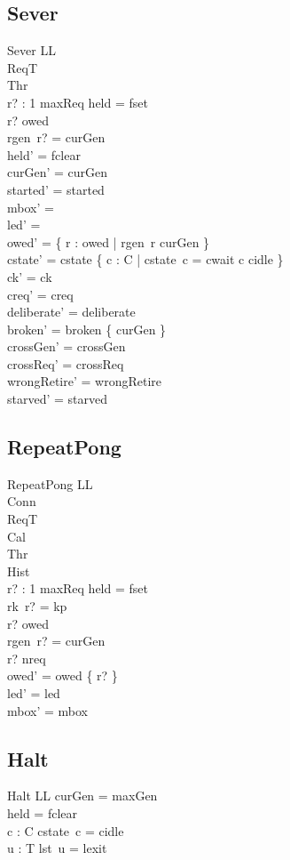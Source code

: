 \documentclass[a4paper,10pt,fleqn]{article}
\begin{document}
\subsection{Sever}

\begin{schema}{Sever}
  \Delta LL \\
  \Xi ReqT \\
  \Xi Thr \\
  r? : 1 \upto maxReq
\where
  held = fset \\
  r? \in owed \\
  rgen~r? = curGen \\
  held' = fclear \\
  curGen' = curGen \\
  started' = started \\
  mbox' = \emptyset \\
  led' = \emptyset \\
  owed' = \{ r : owed | rgen~r \neq curGen \} \\
  cstate' = cstate \oplus \{ c : C | cstate~c = cwait \spot c \mapsto cidle \} \\
  ck' = ck \\
  creq' = creq \\
  deliberate' = deliberate \\
  broken' = broken \cup \{ curGen \} \\
  crossGen' = crossGen \\
  crossReq' = crossReq \\
  wrongRetire' = wrongRetire \\
  starved' = starved
\end{schema}

\subsection{RepeatPong}

\begin{schema}{RepeatPong}
  \Delta LL \\
  \Xi Conn \\
  \Xi ReqT \\
  \Xi Cal \\
  \Xi Thr \\
  \Xi Hist \\
  r? : 1 \upto maxReq
\where
  held = fset \\
  rk~r? = kp \\
  r? \notin owed \\
  rgen~r? = curGen \\
  r? \leq nreq \\
  owed' = owed \cup \{ r? \} \\
  led' = led \\
  mbox' = mbox
\end{schema}

\subsection{Halt}

\begin{schema}{Halt}
  \Xi LL
\where
  curGen = maxGen \\
  held = fclear \\
  \forall c : C \spot cstate~c = cidle \\
  \forall u : T \spot lst~u = lexit
\end{schema}
\end{document}
